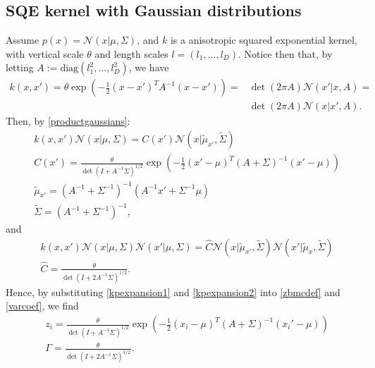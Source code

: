 \subsection{SQE kernel with Gaussian distributions}
Assume $p(x) = \mathcal{N}(x|\mu,\Sigma)$, and $k$ is a anisotropic squared exponential kernel, with vertical scale $\theta$ and length scales $l = (l_1,...,l_D)$. Notice then that, by letting $A := \text{diag}(l_1^2,...,l_D^2)$, we have 
\begin{equation} \label{rbfasnormal}
\begin{split}
k(x,x') = \theta \exp \left( -\frac{1}{2} (x - x')^T A^{-1} (x - x') \right) = & \det(2 \pi A) \mathcal{N}(x'|x,A) = \\
& \det(2 \pi A) \mathcal{N}(x|x',A).
\end{split}
\end{equation}
Then, by \eqref{productgaussians}:
\begin{equation} \label{kpexpansion1}
\begin{split}
& k(x,x') \mathcal{N}(x|\mu,\Sigma) = C(x') \mathcal{N}(x|\tilde{\mu}_{x'},\tilde{\Sigma}) \\
& C(x') = \frac{\theta}{\det(I + A^{-1} \Sigma)^{1/2}} \exp \left(-\frac{1}{2}(x' - \mu)^T (A + \Sigma)^{-1}(x' - \mu) \right) \\
& \tilde{\mu}_{x'} = (A^{-1} + \Sigma^{-1})^{-1} (A^{-1} x' + \Sigma^{-1} \mu) \\
& \tilde{\Sigma} = (A^{-1} + \Sigma^{-1})^{-1},
\end{split}
\end{equation}
and
\begin{equation} \label{kpexpansion2}
\begin{split}
& k(x,x') \mathcal{N}(x|\mu,\Sigma) \mathcal{N}(x'|\mu,\Sigma) = \hat{C} \mathcal{N}(x|\tilde{\mu}_{x'},\tilde{\Sigma}) \mathcal{N}(x'|\tilde{\mu}_{x},\tilde{\Sigma}) \\
& \hat{C} = \frac{\theta}{\det(I + 2 A^{-1} \Sigma)^{1/2}}.
\end{split}
\end{equation}
Hence, by substituting \eqref{kpexpansion1} and \eqref{kpexpansion2} into \eqref{zbmcdef} and \eqref{varcoef}, we find 
\begin{equation}\label{termsbmcgaussian}
\begin{split}
& z_i = \frac{\theta}{\det(I + A^{-1} \Sigma)^{1/2}} \exp \left(-\frac{1}{2}(x_i - \mu)^T (A + \Sigma)^{-1}(x_i' - \mu) \right) \\
& \Gamma = \frac{\theta}{\det(I + 2 A^{-1} \Sigma)^{1/2}}.
\end{split}
\end{equation}

